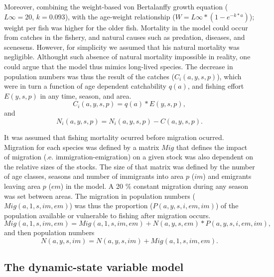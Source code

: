 \documentclass[12pt,oneline,a4paper,numbib]{ouparticle}
\numberwithin{equation}{subsection} %
\begin{document}
Moreover, combining the weight-based von Bertalanffy growth equation ($L\infty= 20$, $k= 0.093$), with the age-weight relationship ($W= L\infty*(1-e^{-k*a})$); weight per fish was higher for the older fish. Mortality in the model could occur from catches in the fishery, and natural causes such as predation, diseases, and scenesens. However, for simplicity we assumed that his natural mortality was negligible. Althought such absence of natural mortality impossible in reality, one could argue that the model thus mimics long-lived species. The decrease in population numbers was thus the result of the catches ($C_i (a, y, s, p)$), which were in turn a function of age dependent catchability $q(a)$, and fishing effort $E (y,s,p)$ in any time, season, and area. 
\begin{equation}
C_i (a, y, s, p) = q(a) * E(y,s,p),
\end{equation}
and 
\begin{equation}
N_i (a, y, s, p) = N_i (a, y, s, p) - C (a, y, s, p). 
\end{equation}

It was assumed that fishing mortality ocurred before migration ocurred. Migration for each species was defined by a matrix $Mig$ that defines the impact of migration (.e. immigration-emigration) on a given stock was also dependent on the relative sizes of the stocks. The size of that matrix  was defined by the number of age classes, seasons and number of immigrants into area $p$ ($im$) and emigrants leaving area $p$ ($em$) in the model. A 20 \% constant migration during any season was set between areas. The migration in population numbers ($Mig (a, 1, s, im, em)$) was thus the proportion ($P (a, y, s, i, em, im)$) of the population available or vulnerable to fishing after migration occurs.   
\begin{equation}
Mig (a, 1, s, im, em) = Mig(a, 1, s, im, em) + N (a, y, s, em) * P (a, y, s, i, em, im),
\end{equation}
and then population numbers
\begin{equation}
N (a, y, s, im) = N (a, y, s, im) +  Mig (a, 1, s, im, em).
\end{equation}

\subsection{The dynamic-state variable model}
\label{sec2.2}
\end{document}

